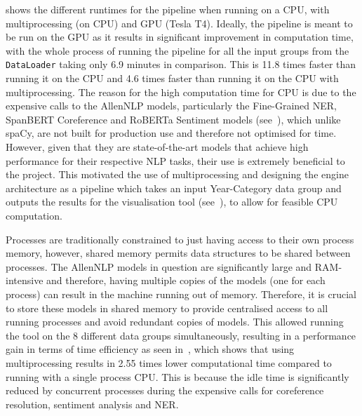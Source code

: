  shows the different runtimes for the pipeline when running on a CPU, with multiprocessing (on CPU) and GPU (Tesla T4). Ideally, the pipeline is meant to be run on the GPU as it results in significant improvement in computation time, with the whole process of running the pipeline for all the input groups from the \texttt{DataLoader} taking only 6.9 minutes in comparison. This is 11.8 times faster than running it on the CPU and 4.6 times faster than running it on the CPU with multiprocessing. The reason for the high computation time for CPU is due to the expensive calls to the AllenNLP models, particularly the Fine-Grained NER, SpanBERT Coreference and RoBERTa Sentiment models (see~), which unlike spaCy, are not built for production use and therefore not optimised for time. However, given that they are state-of-the-art models that achieve high performance for their respective NLP tasks, their use is extremely beneficial to the project. This motivated the use of multiprocessing and designing the engine architecture as a pipeline which takes an input Year-Category data group and outputs the results for the visualisation tool (see~), to allow for feasible CPU computation. 

Processes are traditionally constrained to just having access to their own process memory, however, shared memory permits data structures to be shared between processes. The AllenNLP models in question are significantly large and RAM-intensive and therefore, having multiple copies of the models (one for each process) can result in the machine running out of memory. Therefore, it is crucial to store these models in shared memory to provide centralised access to all running processes and avoid redundant copies of models. This allowed running the tool on the 8 different data groups simultaneously, resulting in a performance gain in terms of time efficiency as seen in~, which shows that using multiprocessing results in 2.55 times lower computational time compared to running with a single process CPU. This is because the idle time is significantly reduced by concurrent processes during the expensive calls for coreference resolution, sentiment analysis and NER. 

